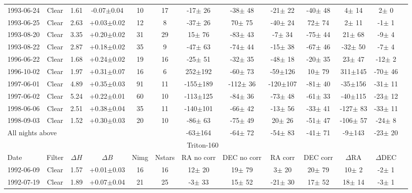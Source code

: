 \documentclass[12pt,a4paper]{report}
\begin{document}
\begin{landscape}
\begin{longtable}{|l|c|c|c|c|c|c|c|c|c|c|c|c|}
1993-06-24 & Clear & 1.61 & -0.07$\pm$0.04 &  10 &  17 &  -17$\pm$ 26 &  -38$\pm$ 48 &  -21$\pm$ 22 &  -40$\pm$ 48 &    4$\pm$ 14 &    2$\pm$  0 \\ 
1993-06-25 & Clear & 2.63 & +0.03$\pm$0.02 &  12 &   8 &  -37$\pm$ 26 &   70$\pm$ 75 &  -40$\pm$ 24 &   72$\pm$ 74 &    2$\pm$ 11 &   -1$\pm$  1 \\ 
1993-08-20 & Clear & 3.35 & +0.20$\pm$0.02 &  31 &  29 &   15$\pm$ 76 &  -83$\pm$ 43 &   -7$\pm$ 34 &  -75$\pm$ 44 &   21$\pm$ 68 &   -9$\pm$  4 \\ 
1993-08-22 & Clear & 2.87 & +0.18$\pm$0.02 &  35 &   9 &  -47$\pm$ 63 &  -74$\pm$ 44 &  -15$\pm$ 38 &  -67$\pm$ 46 &  -32$\pm$ 50 &   -7$\pm$  4 \\ 
1996-06-22 & Clear & 1.68 & +0.24$\pm$0.02 &  19 &  16 &  -25$\pm$ 51 &  -32$\pm$ 35 &  -48$\pm$ 18 &  -20$\pm$ 35 &   23$\pm$ 47 &  -12$\pm$  2 \\ 
1996-10-02 & Clear & 1.97 & +0.31$\pm$0.07 &  16 &   6 &  252$\pm$192 &  -60$\pm$ 73 &  -59$\pm$126 &   10$\pm$ 79 &  311$\pm$145 &  -70$\pm$ 46 \\ 
1997-06-01 & Clear & 4.89 & +0.35$\pm$0.03 &  91 &  11 & -155$\pm$189 & -112$\pm$ 36 & -120$\pm$107 &  -81$\pm$ 40 &  -35$\pm$156 &  -31$\pm$ 11 \\ 
1997-06-02 & Clear & 5.24 & +0.22$\pm$0.01 &  60 &  10 & -113$\pm$125 &  -84$\pm$ 36 &  -73$\pm$ 48 &  -61$\pm$ 33 &  -40$\pm$115 &  -23$\pm$ 12 \\ 
1998-06-06 & Clear & 2.51 & +0.38$\pm$0.04 &  35 &  11 & -140$\pm$101 &  -66$\pm$ 42 &  -13$\pm$ 56 &  -33$\pm$ 41 & -127$\pm$ 83 &  -33$\pm$ 11 \\ 
1998-09-03 & Clear & 1.52 & +0.30$\pm$0.03 &  20 &  10 &  -86$\pm$ 63 &  -75$\pm$ 49 &   20$\pm$ 26 &  -51$\pm$ 47 & -106$\pm$ 57 &  -24$\pm$  8 \\
\hline
\multicolumn{6}{|l|}{All nights above} & -63$\pm$164 &  -64$\pm$ 72 &  -54$\pm$ 83 &  -41$\pm$ 71 &   -9$\pm$143 &  -23$\pm$ 20 \\
\hline
\multicolumn{12}{|c|}{Triton-160}\\
Date & Filter & $\Delta H$ & $\Delta B$ & Nimg & Nstars & RA no corr & DEC no corr & RA corr & DEC corr & $\Delta$RA & $\Delta$DEC \\
\hline
1992-06-09 & Clear & 1.57 & +0.01$\pm$0.03 &  16 &  16 &   12$\pm$ 20 &   19$\pm$ 79 &    3$\pm$ 20 &   20$\pm$ 79 &   10$\pm$  2 &   -2$\pm$  1 \\ 
1992-07-19 & Clear & 1.89 & +0.07$\pm$0.04 &  21 &  25 &   -3$\pm$ 33 &   15$\pm$ 52 &  -21$\pm$ 30 &   17$\pm$ 52 &   18$\pm$ 14 &   -3$\pm$  1 \\ 

\end{longtable}
\end{landscape}
\end{document}
